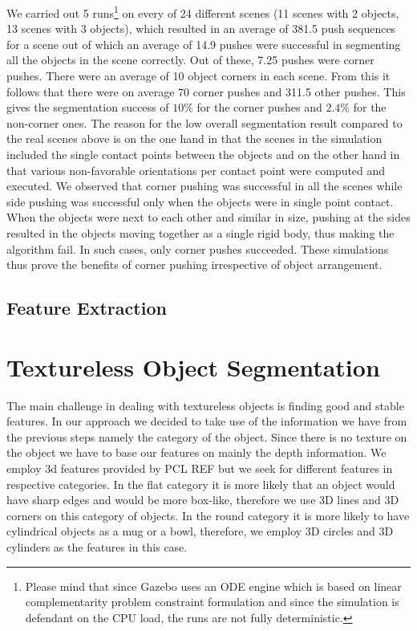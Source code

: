 We carried out 5 runs\footnote{Please mind that since Gazebo uses an ODE engine 
which is based on linear complementarity problem constraint formulation and since the
simulation is defendant on the CPU load, the runs are not fully deterministic.} 
on every of 24 different  scenes (11 scenes  with 2
objects, 13  scenes with  3 objects), which resulted in an average  of 381.5
push sequences for a scene out of which an average of 14.9 pushes were
successful in segmenting  all the objects in the  scene correctly. Out
of these, 7.25  pushes were corner pushes. There were an average  of 10
object corners in each scene. From this it follows that there were on average
70 corner pushes and 311.5 other pushes. This gives the segmentation success of $10\%$
for the corner pushes and $2.4\%$ for the non-corner ones. The reason for the low
overall segmentation result compared to the real scenes above is on the one hand in that the scenes in the simulation
included the single contact points between the objects and on the other hand in 
that various non-favorable orientations per contact point were computed and executed.
We observed  that corner pushing was successful  in all  the scenes while  side pushing  was successful
only  when  the  objects were in single point contact. 
When the  objects were next to each other  and similar in size,
pushing  at the sides  resulted in  the objects  moving together  as a
single rigid body, thus making the algorithm fail. In such cases, only
corner  pushes succeeded.  These simulations  thus prove the benefits of
corner pushing irrespective of object arrangement.



\subsection{Feature Extraction}

\section{Textureless Object Segmentation}
\label{sec:textureless}

The main challenge in dealing with textureless objects is finding good and stable features. In our approach we decided to take use of the information we have from the previous steps namely the category of the object. Since there is no texture on the object we have to base our features on mainly the depth information. We employ 3d features provided by PCL REF but we seek for different features in respective categories. In the flat category it is more likely that an object would have sharp edges and would be more box-like, therefore we use 3D lines and 3D corners on this category of objects. In the round category it is more likely to have cylindrical objects as a mug or a bowl, therefore, we employ 3D circles and 3D cylinders as the features in this case.

